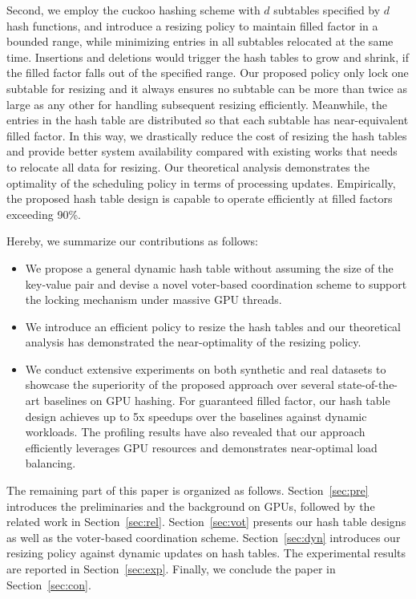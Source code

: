 Second, we employ the cuckoo hashing scheme with $d$ subtables specified by $d$ hash functions, and introduce a resizing policy to maintain filled factor in a bounded range, while minimizing entries in all subtables relocated at the same time. Insertions and deletions would trigger the hash tables to grow and shrink, if the filled factor falls out of the specified range. 
Our proposed policy only lock one subtable for resizing and it always ensures no subtable can be more than twice as large as any other for handling subsequent resizing efficiently. Meanwhile, the entries in the hash table are distributed so that each subtable has near-equivalent filled factor.
In this way, we drastically reduce the cost of resizing the hash tables and provide better system availability compared with existing works that needs to relocate all data for resizing.
Our theoretical analysis demonstrates the optimality of the scheduling policy in terms of processing updates. 
Empirically, the proposed hash table design is capable to operate efficiently at filled factors exceeding 90\%.

Hereby, we summarize our contributions as follows:
\begin{itemize}
	\item We propose a general dynamic hash table without assuming the size of the key-value pair and devise a novel voter-based coordination scheme to support the locking mechanism under massive GPU threads. 
	\item We introduce an efficient policy to resize the hash tables and our theoretical analysis has demonstrated the near-optimality of the resizing policy.
	\item We conduct extensive experiments on both synthetic and real datasets to showcase the superiority of the proposed approach over several state-of-the-art baselines on GPU hashing. 
	For guaranteed filled factor, our hash table design achieves up to 5x speedups over the baselines against dynamic workloads. The profiling results have also revealed that our approach efficiently leverages GPU resources and demonstrates near-optimal load balancing. 
\end{itemize}

The remaining part of this paper is organized as follows. Section~\ref{sec:pre} introduces the preliminaries and the background on GPUs, followed by the related work in Section~\ref{sec:rel}. Section~\ref{sec:vot} presents our hash table designs as well as the voter-based coordination scheme.  Section~\ref{sec:dyn} introduces our resizing policy against dynamic updates on hash tables. The experimental results are reported in Section~\ref{sec:exp}. Finally, we conclude the paper in Section~\ref{sec:con}. 